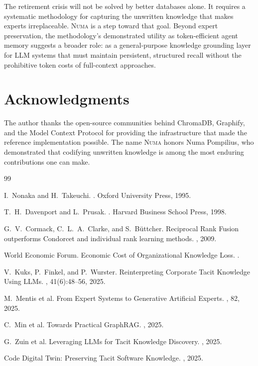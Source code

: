 \documentclass[11pt,a4paper]{article}
\begin{document}
The retirement crisis will not be solved by better databases alone. It requires a systematic methodology for capturing the unwritten knowledge that makes experts irreplaceable. \textsc{Numa} is a step toward that goal. Beyond expert preservation, the methodology's demonstrated utility as token-efficient agent memory suggests a broader role: as a general-purpose knowledge grounding layer for LLM systems that must maintain persistent, structured recall without the prohibitive token costs of full-context approaches.

\section*{Acknowledgments}

The author thanks the open-source communities behind ChromaDB, Graphify, and the Model Context Protocol for providing the infrastructure that made the reference implementation possible. The name \textsc{Numa} honors Numa Pompilius, who demonstrated that codifying unwritten knowledge is among the most enduring contributions one can make.

\begin{thebibliography}{99}

I.~Nonaka and H.~Takeuchi.
.
\newblock Oxford University Press, 1995.

T.~H.~Davenport and L.~Prusak.
.
\newblock Harvard Business School Press, 1998.

G.~V.~Cormack, C.~L.~A.~Clarke, and S.~B\"uttcher.
\newblock Reciprocal Rank Fusion outperforms Condorcet and individual rank learning methods.
, 2009.

World Economic Forum.
\newblock Economic Cost of Organizational Knowledge Loss.
.

V.~Kuks, P.~Finkel, and P.~Wurster.
\newblock Reinterpreting Corporate Tacit Knowledge Using LLMs.
, 41(6):48--56, 2025.

M.~Mentis et al.
\newblock From Expert Systems to Generative Artificial Experts.
, 82, 2025.

C.~Min et al.
\newblock Towards Practical GraphRAG.
, 2025.

G.~Zuin et al.
\newblock Leveraging LLMs for Tacit Knowledge Discovery.
, 2025.

Code Digital Twin: Preserving Tacit Software Knowledge.
, 2025.

\end{thebibliography}
\end{document}

